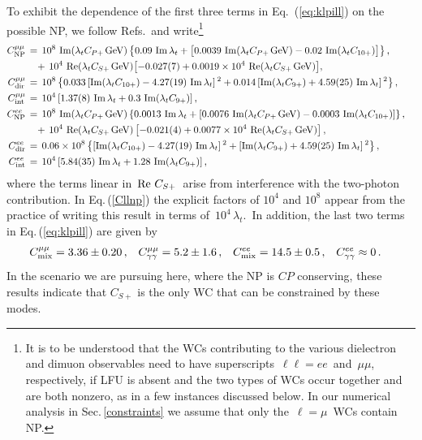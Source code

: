 \documentclass[amsmath,amssymb,aps,nofootinbib,prd,preprint,superscriptaddress,tightenlines,a4paper,bm]{revtex4-2}
\begin{document}
To exhibit the dependence of the first three terms in Eq.~(\ref{eq:klpill}) on the possible NP, we follow Refs.\,\cite{Mescia:2006jd,DAmbrosio:2022kvb} and write\footnote{It is to be understood that the WCs contributing to the various dielectron and dimuon observables need to have superscripts \,$\ell\ell=ee$\, and \,$\mu\mu$,\, respectively, if LFU is absent and the two types of WCs occur together and are both nonzero, as in a few instances discussed below.
In our numerical analysis in Sec.\,\ref{constraints} we assume that only the \,$\ell=\mu$\, WCs contain NP.}
\begin{align}
     C_{\rm NP}^{\mu\mu} & \,=\, 10^{8}~{\rm Im} (\lambda_t C_{P+\,}{\rm GeV}) \left\{ 0.09~ {\rm Im}\, \lambda_t +\big[0.0039 ~{\rm Im} (\lambda_t C_{P+\,}{\rm GeV}) - 0.02~ {\rm Im}(\lambda_t C_{10+})\big]\right\} , \nonumber \\
     & ~~~ +\, 10^4~ {\rm Re} (\lambda_tC_{S+\,}{\rm GeV}) \big[{-}0.027(7)+0.0019\times 10^4~{\rm Re}(\lambda_t C_{S+\,}{\rm GeV}) \big] , \nonumber \\
    C_{\rm dir}^{\mu\mu} & \,=\, 10^8 \left\{ 0.033 \left[ {\rm Im}(\lambda_t C_{10+})-4.27(19)~ {\rm Im}\,\lambda_t \right]{}^2 + 0.014 \left[{\rm Im}(\lambda_t C_{9+})+4.59(25)~ {\rm Im}\,\lambda_t \right]{}^2 \right\} , \nonumber \\
    C_{\rm int}^{\mu\mu} & \,=\, 10^4 \left[ 1.37(8)~ {\rm Im}\,\lambda_t + 0.3~ {\rm Im}(\lambda_t C_{9+}) \right] , \nonumber \\
    C_{\rm NP}^{ee} & \,=\, 10^{8}~{\rm Im} (\lambda_t C_{P+\,}{\rm GeV}) \left\{ 0.0013~ {\rm Im}\, \lambda_t + \left[ 0.0076 ~{\rm Im} (\lambda_tC_{P+\,}{\rm GeV})-0.0003~ {\rm Im}(\lambda_tC_{10+})\right] \right\} , \nonumber \\
     & ~~~ +\, 10^4~{\rm Re} (\lambda_t C_{S+\,}{\rm GeV})\left[ {-}0.021(4)+0.0077\times 10^4~ {\rm Re}(\lambda_t C_{S+\,}{\rm GeV}) \right] , \nonumber \\
    C_{\rm dir}^{ee} & \,=\, 0.06\times 10^8 \left\{ \left[ {\rm Im}(\lambda_t C_{10+})-4.27(19)~ {\rm Im}\, \lambda_t \right] {}^2 + \left[ {\rm Im}(\lambda_t C_{9+})+4.59(25)~ {\rm Im}\, \lambda_t \right] {}^2 \right\} , \nonumber \\
    C_{\rm int}^{ee} & \,=\, 10^4 \left[ 5.84(35)~ {\rm Im}\, \lambda_t + 1.28~ {\rm Im}(\lambda_tC_{9+}) \right] , & \label{Cllnp}
\end{align}
where the terms linear in \,${\rm Re}~C_{S+}$\, arise from interference with the two-photon contribution.
In Eq.\,(\ref{Cllnp}) the explicit factors of $10^4$ and $10^8$ appear from the practice of writing this result in terms of \,$10^4\,\lambda_t$.\,
In addition, the last two terms in Eq.\,(\ref{eq:klpill}) are given by
\begin{align}
    C_{\rm mix}^{\mu\mu} & = 3.36 \pm 0.20 \,, & C_{\gamma \gamma}^{\mu\mu} & = 5.2 \pm 1.6 \,, &
    C_{\rm mix}^{ee} & = 14.5\pm 0.5 \,, & C_{\gamma \gamma}^{ee} & \approx 0 \,. &
\end{align}
In the scenario we are pursuing here, where the NP is $CP$ conserving, these results indicate that $C_{S+}$ is the only WC that can be constrained by these modes.
\end{document}

